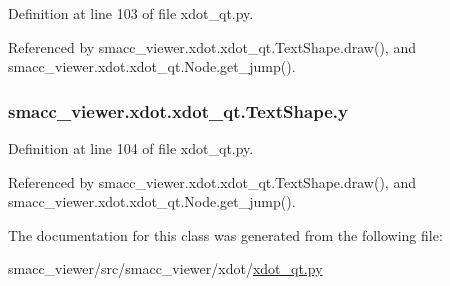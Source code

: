 Definition at line 103 of file xdot\+\_\+qt.\+py.



Referenced by smacc\+\_\+viewer.\+xdot.\+xdot\+\_\+qt.\+Text\+Shape.\+draw(), and smacc\+\_\+viewer.\+xdot.\+xdot\+\_\+qt.\+Node.\+get\+\_\+jump().

\subsubsection[{\texorpdfstring{y}{y}}]{\setlength{\rightskip}{0pt plus 5cm}smacc\+\_\+viewer.\+xdot.\+xdot\+\_\+qt.\+Text\+Shape.\+y}\hypertarget{classsmacc__viewer_1_1xdot_1_1xdot__qt_1_1TextShape_ae50d05feb01bc8e1544cb9c8c6a312f1}{}\label{classsmacc__viewer_1_1xdot_1_1xdot__qt_1_1TextShape_ae50d05feb01bc8e1544cb9c8c6a312f1}


Definition at line 104 of file xdot\+\_\+qt.\+py.



Referenced by smacc\+\_\+viewer.\+xdot.\+xdot\+\_\+qt.\+Text\+Shape.\+draw(), and smacc\+\_\+viewer.\+xdot.\+xdot\+\_\+qt.\+Node.\+get\+\_\+jump().



The documentation for this class was generated from the following file\+:\begin{DoxyCompactItemize}
\item 
smacc\+\_\+viewer/src/smacc\+\_\+viewer/xdot/\hyperlink{xdot__qt_8py}{xdot\+\_\+qt.\+py}\end{DoxyCompactItemize}
